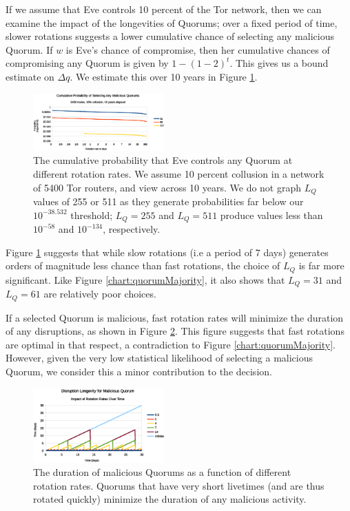 \documentclass{sig-alternate}
\begin{document}
If we assume that Eve controls 10 percent of the Tor network, then we can examine the impact of the longevities of Quorums; over a fixed period of time, slower rotations suggests a lower cumulative chance of selecting any malicious Quorum. If $ w $ is Eve's chance of compromise, then her cumulative chances of compromising any Quorum is given by $ 1 - (1-2)^t $. This gives us a bound estimate on $ \Delta q $. We estimate this over 10 years in Figure \ref{chart:cumulativeProbability}.

\begin{figure}[htbp]
	\centering
	\includegraphics[width=0.45\textwidth]{../analysis/CumulativeMaliciousQuorum.eps}
	\caption{The cumulative probability that Eve controls any Quorum at different rotation rates. We assume 10 percent collusion in a network of 5400 Tor routers, and view across 10 years. We do not graph $ L_{Q} $ values of 255 or 511 as they generate probabilities far below our $ 10^{-38.532} $ threshold; $ L_{Q} = 255 $ and $ L_{Q} = 511 $ produce values less than $ 10^{-58} $ and $ 10^{-134} $, respectively.}
	\label{chart:cumulativeProbability}
\end{figure}

Figure \ref{chart:cumulativeProbability} suggests that while slow rotations (i.e a period of 7 days) generates orders of magnitude less chance than fast rotations, the choice of $ L_{Q} $ is far more significant. Like Figure \ref{chart:quorumMajority}, it also shows that $ L_{Q} = 31 $ and $ L_{Q} = 61 $ are relatively poor choices.

If a selected Quorum is malicious, fast rotation rates will minimize the duration of any disruptions, as shown in Figure \ref{chart:quorumLongevity}. This figure suggests that fast rotations are optimal in that respect, a contradiction to Figure \ref{chart:quorumMajority}. However, given the very low statistical likelihood of selecting a malicious Quorum, we consider this a minor contribution to the decision.

\begin{figure}[htbp]
	\centering
	\includegraphics[width=0.45\textwidth]{../analysis/MaliciousLongevityRotations.eps}
	\caption{The duration of malicious Quorums as a function of different rotation rates. Quorums that have very short livetimes (and are thus rotated quickly) minimize the duration of any malicious activity.}
	\label{chart:quorumLongevity}
\end{figure}
\end{document}
